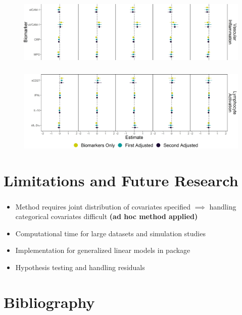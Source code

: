 \documentclass[xcolor=dvipsnames]{beamer}
\begin{document}
\begin{frame}
\frametitle{\insertsectionhead}
\begin{figure}
	\begin{center}
		\includegraphics[scale = 0.37]{figure_2_AIDS_middle.jpg}
	\end{center}
\end{figure}
\end{frame}

\begin{frame}
\frametitle{\insertsectionhead}
\begin{figure}
	\begin{center}
		\includegraphics[scale = 0.37]{figure_2_AIDS_bottom.jpg}
	\end{center}
\end{figure}
\end{frame}

\section{Limitations and Future Research}
\begin{frame}
\frametitle{\insertsectionhead}
\begin{itemize}
\item Method requires joint distribution of covariates specified $\implies$
handling categorical covariates difficult \textbf{(ad hoc method applied)}
\item Computational time for large datasets and simulation studies
\item Implementation for generalized linear models in package 
\item Hypothesis testing and handling residuals
\end{itemize}
\end{frame}

\section{Bibliography}
\begin{frame}[allowframebreaks]
\frametitle{\insertsectionhead}
\printbibliography
\end{frame}
\end{document}
